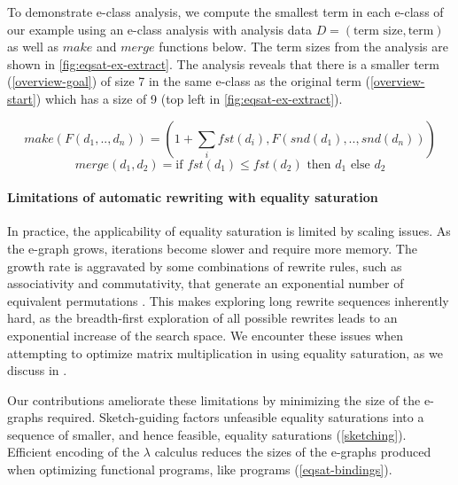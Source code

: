 To demonstrate e-class analysis, we compute the smallest term in each e-class of our example using an e-class analysis with analysis data $D = (\text{term size}, \text{term})$ as well as $make$ and $merge$ functions below.
The term sizes from the analysis are shown in \cref{fig:eqsat-ex-extract}.
The analysis reveals that there is a smaller term (\ref{overview-goal}) of size 7 in the same e-class as the original term (\ref{overview-start}) which has a size of 9 (top left in \cref{fig:eqsat-ex-extract}).

$$ make(F(d_1, .., d_n)) = (1 + \sum_{i} fst(d_i), F(snd(d_1), .., snd(d_n))) $$
$$ merge(d_1, d_2) = \text{if } fst(d_1) \leq fst(d_2) \text{ then } d_1 \text{ else } d_2 $$

\noindent

\paragraph{Limitations of automatic rewriting with equality saturation}
In practice, the applicability of equality saturation is limited by scaling issues.
As the e-graph grows, iterations become slower and require more memory.
The growth rate is aggravated by some combinations of rewrite rules, such as associativity and commutativity, that generate an exponential number of equivalent permutations \cite{wang2020-spores, nandi2020-synthesizing-CAD, willsey2021-egg}.
This makes exploring long rewrite sequences inherently hard, as the breadth-first exploration of all possible rewrites leads to an exponential increase of the search space.
We encounter these issues when attempting to optimize matrix multiplication in \Rise{} using equality saturation, as we discuss in .

Our contributions ameliorate these limitations by minimizing the size of the e-graphs required.
Sketch-guiding factors unfeasible equality saturations into a sequence of smaller, and hence feasible, equality saturations (\cref{sketching}).
Efficient encoding of the $\lambda$ calculus reduces the sizes of the e-graphs produced when optimizing functional programs, like \Rise{} programs (\cref{eqsat-bindings}).